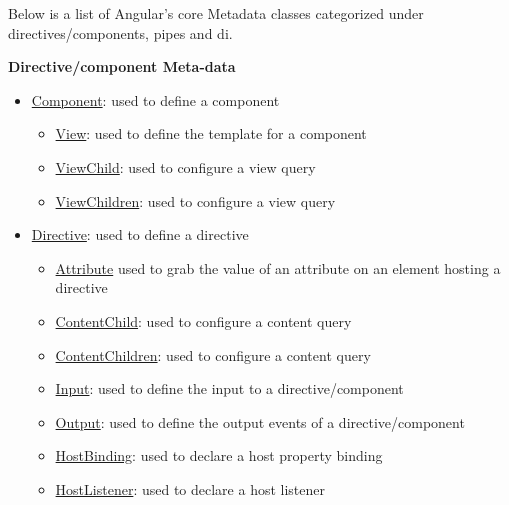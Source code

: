 \documentclass[12pt,]{article}
\providecommand{\tightlist}{%
  \setlength{\itemsep}{0pt}\setlength{\parskip}{0pt}}
\begin{document}
Below is a list of Angular's core Metadata classes categorized under
directives/components, pipes and di.

\textbf{Directive/component Meta-data}

\begin{itemize}
\item
  \href{https://angular.io/docs/ts/latest/api/core/ComponentMetadata-class.html}{Component}:
  used to define a component

  \begin{itemize}
  \tightlist
  \item
    \href{https://angular.io/docs/ts/latest/api/core/ViewMetadata-class.html}{View}:
    used to define the template for a component
  \item
    \href{https://angular.io/docs/ts/latest/api/core/ViewChildMetadata-class.html}{ViewChild}:
    used to configure a view query
  \item
    \href{https://angular.io/docs/ts/latest/api/core/ViewChildrenMetadata-class.html}{ViewChildren}:
    used to configure a view query
  \end{itemize}
\item
  \href{https://angular.io/docs/ts/latest/api/core/DirectiveMetadata-class.html}{Directive}:
  used to define a directive

  \begin{itemize}
  \tightlist
  \item
    \href{https://angular.io/docs/ts/latest/api/core/AttributeMetadata-class.html}{Attribute}
    used to grab the value of an attribute on an element hosting a
    directive
  \item
    \href{https://angular.io/docs/ts/latest/api/core/ContentChildMetadata-class.html}{ContentChild}:
    used to configure a content query
  \item
    \href{https://angular.io/docs/ts/latest/api/core/ContentChildrenMetadata-class.html}{ContentChildren}:
    used to configure a content query
  \item
    \href{https://angular.io/docs/ts/latest/api/core/InputMetadata-class.html}{Input}:
    used to define the input to a directive/component
  \item
    \href{https://angular.io/docs/ts/latest/api/core/OutputMetadata-class.html}{Output}:
    used to define the output events of a directive/component
  \item
    \href{https://angular.io/docs/ts/latest/api/core/HostBindingMetadata-class.html}{HostBinding}:
    used to declare a host property binding
  \item
    \href{https://angular.io/docs/ts/latest/api/core/HostListenerMetadata-class.html}{HostListener}:
    used to declare a host listener
  \end{itemize}
\end{itemize}
\end{document}
